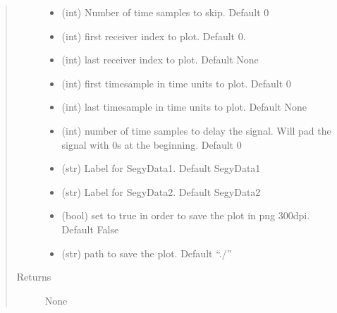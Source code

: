\documentclass[letterpaper,10pt,english]{sphinxmanual}
\begin{document}
\begin{fulllineitems}
\begin{quote}
\begin{description}
\begin{itemize}
\item {} 
 \textendash{} (int)        Number of time samples to skip. Default 0

\item {} 
 \textendash{} (int)        first receiver index to plot. Default 0.

\item {} 
 \textendash{} (int)        last receiver index to plot. Default None

\item {} 
 \textendash{} (int)        first timesample in time units to plot. Default 0

\item {} 
 \textendash{} (int)        last timesample in time units to plot. Default None

\item {} 
 \textendash{} (int)        number of time samples to delay the signal. Will pad the signal with 0s at
the beginning. Default 0

\item {} 
 \textendash{} (str)        Label for SegyData1. Default SegyData1

\item {} 
 \textendash{} (str)        Label for SegyData2. Default SegyData2

\item {} 
 \textendash{} (bool)       set to true in order to save the plot in png 300dpi. Default False

\item {} 
 \textendash{} (str)        path to save the plot. Default “./”

\end{itemize}

\item[{Returns}] \leavevmode
None

\end{description}\end{quote}

\end{fulllineitems}
\end{document}
